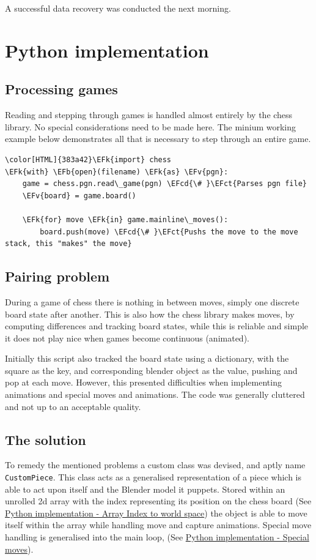 \documentclass[11pt]{article}
\newcommand{\EFk}[1]{\textcolor{EFk}{#1}} %
\newcommand{\EFb}[1]{\textcolor{EFb}{#1}} %
\newcommand{\EFct}[1]{\textcolor{EFct}{#1}} %
\newcommand{\EFv}[1]{\textcolor{EFv}{#1}} %
\newcommand{\EFcd}[1]{\textcolor{EFcd}{#1}} %
\begin{document}
A successful data recovery was conducted the next morning.
\section{Python implementation}
\label{sec:org34252e9}
\subsection{Processing games}
\label{sec:org8d9dacd}
Reading and stepping through games is handled almost entirely by the chess
library. No special considerations need to be made here. The minium working
example below demonstrates all that is necessary to step through an entire game.

\begin{Code}
\begin{Verbatim}[]
\color[HTML]{383a42}\EFk{import} chess
\EFk{with} \EFb{open}(filename) \EFk{as} \EFv{pgn}:
    game = chess.pgn.read\_game(pgn) \EFcd{\# }\EFct{Parses pgn file}
    \EFv{board} = game.board()

    \EFk{for} move \EFk{in} game.mainline\_moves():
        board.push(move) \EFcd{\# }\EFct{Pushs the move to the move stack, this "makes" the move}
\end{Verbatim}
\end{Code}
\subsection{Pairing problem}
\label{sec:org52f019c}
During a game of chess there is nothing in between moves, simply one discrete
board state after another. This is also how the chess library makes moves, by
computing differences and tracking board states, while this is reliable and
simple it does not play nice when games become continuous (animated).

Initially this script also tracked the board state using a dictionary, with the
square as the key, and corresponding blender object as the value, pushing and
pop at each move. However, this presented difficulties when implementing
animations and special moves and animations. The code was generally cluttered
and not up to an acceptable quality.
\subsection{The solution}
\label{sec:org65a1e0d}
To remedy the mentioned problems a custom class was devised, and aptly name
\texttt{CustomPiece}. This class acts as a generalised representation of a piece which
is able to act upon itself and the Blender model it puppets. Stored within an
unrolled 2d array with the index representing its position on the chess board
(See \hyperref[sec:orgecee11b]{Python implementation - Array Index to world space}) the object is able to
move itself within the array while handling move and capture animations. Special
move handling is generalised into the main loop, (See \hyperref[sec:org50424d4]{Python implementation -
Special moves}).
\end{document}
